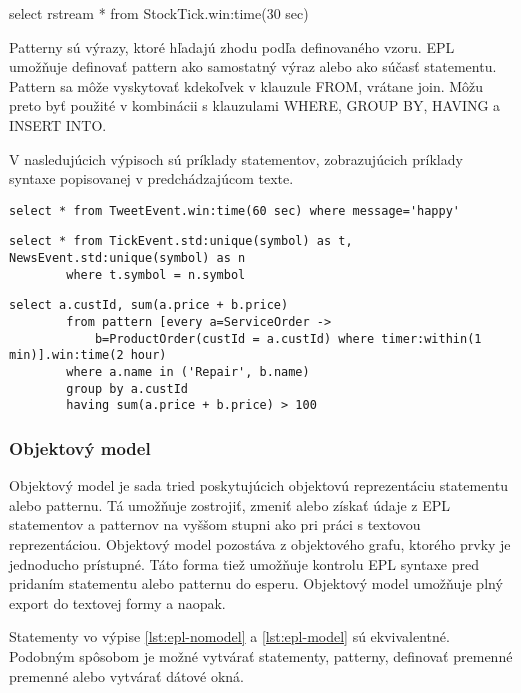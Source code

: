 	select rstream * from StockTick.win:time(30 sec)

		Patterny sú výrazy, ktoré hľadajú zhodu podľa definovaného vzoru. EPL umožňuje definovať pattern ako samostatný výraz alebo ako súčasť statementu. Pattern sa môže vyskytovať kdekoľvek v klauzule FROM, vrátane join. Môžu preto byť použité v kombinácii s klauzulami WHERE, GROUP BY, HAVING a INSERT INTO.

		V nasledujúcich výpisoch sú príklady statementov, zobrazujúcich príklady syntaxe popisovanej v predchádzajúcom texte.
				
		\begin{lstlisting}[label=lst:epl-simple,caption=Jednoduchý EPL statement]
		select * from TweetEvent.win:time(60 sec) where message='happy'
		\end{lstlisting}
		
		\begin{lstlisting}[label=lst:epl-join,caption=Jednoduchý EPL statements použitím join]
		select * from TickEvent.std:unique(symbol) as t, NewsEvent.std:unique(symbol) as n
		where t.symbol = n.symbol
		\end{lstlisting}
		
		\begin{lstlisting}[label=lst:epl-pattern,caption=EPL statement s použitím patternu]
		select a.custId, sum(a.price + b.price)
		from pattern [every a=ServiceOrder -> 
			b=ProductOrder(custId = a.custId) where timer:within(1 min)].win:time(2 hour) 
		where a.name in ('Repair', b.name)
		group by a.custId
		having sum(a.price + b.price) > 100
		\end{lstlisting}
				
		\subsubsection{Objektový model}	
		Objektový model je sada tried poskytujúcich objektovú reprezentáciu statementu alebo patternu. Tá umožňuje zostrojiť, zmeniť alebo získať údaje z EPL statementov a patternov na vyššom stupni ako pri práci s textovou reprezentáciou. Objektový model pozostáva z objektového grafu, ktorého prvky je jednoducho prístupné. Táto forma tiež umožňuje kontrolu EPL syntaxe pred pridaním statementu alebo patternu do esperu. Objektový model umožňuje plný export do textovej formy a naopak.
		
		Statementy vo výpise \ref{lst:epl-nomodel} a \ref{lst:epl-model} sú ekvivalentné. Podobným spôsobom je možné vytvárať statementy, patterny, definovať premenné premenné alebo vytvárať dátové okná.
		
